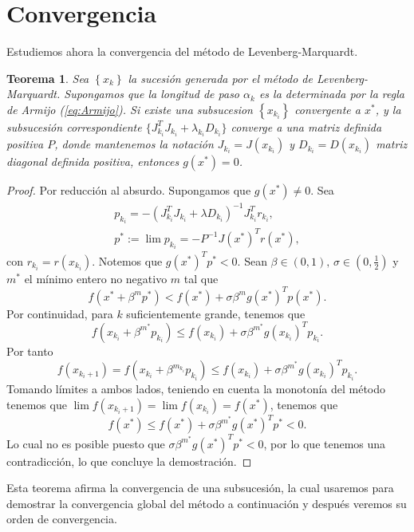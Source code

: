 \documentclass[11pt,a4paper]{book}
\newtheorem{theorem}{Teorema}[chapter]
\theoremstyle{definition}
\theoremstyle{remark}
\newcommand{\sucesionxk}{\left\{x_k\right\}}
\newcommand{\sucesion}[1]{\left\{#1\right\}}
\begin{document}
\section{Convergencia}
Estudiemos ahora la convergencia del método de Levenberg-Marquardt.
\begin{theorem}\label{th:subsucLM}
Sea $\sucesionxk$ la sucesión generada por el método de Levenberg-Marquardt. Supongamos que la longitud de paso $\alpha_k$ es la determinada por la regla de Armijo (\ref{eq:Armijo}). Si existe una subsucesion $\sucesion{x_{k_i}}$ convergente a $x^*$, y la subsucesión correspondiente $\{J_{k_i}^TJ_{k_i}+\lambda_{k_i}D_{k_i}\}$ converge a una matriz definida positiva $P$, donde mantenemos la notación $J_{k_i}=J(x_{k_i})$ y $D_{k_i}=D(x_{k_i})$ matriz diagonal definida positiva, entonces $g(x^*)=0$.
\end{theorem}
\begin{proof}
Por reducción al absurdo. Supongamos que $g(x^*)\neq 0$. Sea
\begin{align}
p_{k_i} = 
-(J^T_{k_i}J_{k_i}+\lambda D_{k_i})^{-1}J^T_{k_i}r_{k_i}, \\
p^* := \lim p_{k_i} = -P^{-1}J(x^*)^Tr(x^*),
\end{align}
con $r_{k_i} = r(x_{k_i})$. Notemos que $g(x^*)^Tp^*<0$. Sean $\beta \in (0,1),\,\sigma \in (0,\frac{1}{2})$ y $m^*$ el mínimo entero no negativo $m$ tal que
\begin{equation}
f(x^*+\beta^mp^*)<f(x^*)+\sigma\beta^mg(x^*)^Tp(x^*).
\end{equation}
Por continuidad, para $k$ suficientemente grande, tenemos que
\begin{equation}
f(x_{k_i}+\beta^{m^*}p_{k_i}) \leq 
f(x_{k_i})+\sigma\beta^{m^*}g(x_{k_i})^Tp_{k_i}.
\end{equation}
Por tanto
\begin{equation}
f(x_{k_i+1})=f(x_{k_i}+\beta^{m_{k_i}}p_{k_i})
\leq f(x_{k_i})+\sigma \beta^{m^*}g(x_{k_i})^Tp_{k_i}.
\end{equation}
Tomando límites a ambos lados, teniendo en cuenta la monotonía del método tenemos que $\lim f(x_{k_i+1}) = \lim f(x_{k_i}) = f(x^*)$, tenemos que
\begin{equation}
f(x^*) \leq f(x^*) + \sigma \beta^{m^*}g(x^*)^Tp^*<0.
\end{equation}
Lo cual no es posible puesto que $\sigma \beta^{m^*}g(x^*)^Tp^*<0$, por lo que tenemos una contradicción, lo que concluye la demostración.
\end{proof}
Esta teorema afirma la convergencia de una subsucesión, la cual usaremos para demostrar la convergencia global del método a continuación y después veremos su orden de convergencia.
\end{document}
